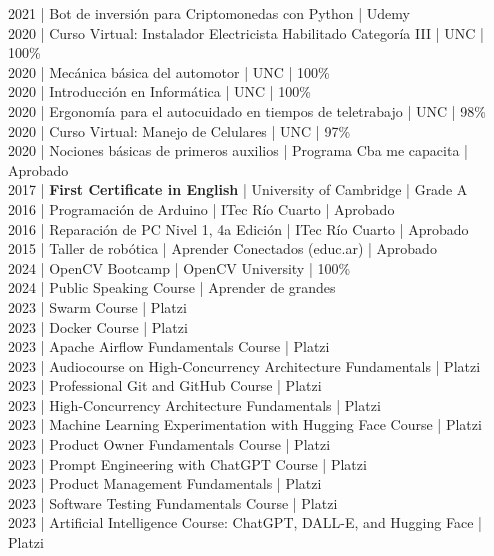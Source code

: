{2021 | Bot de inversión para Criptomonedas con Python | Udemy \\
2020 | Curso Virtual: Instalador Electricista Habilitado Categoría III | UNC | 100\% \\
2020 | Mecánica básica del automotor | UNC | 100\% \\
2020 | Introducción en Informática | UNC | 100\% \\
2020 | Ergonomía para el autocuidado en tiempos de teletrabajo | UNC | 98\% \\
2020 | Curso Virtual: Manejo de Celulares | UNC | 97\% \\
2020 | Nociones básicas de primeros auxilios | Programa Cba me capacita | Aprobado \\
2017 | \textbf{First Certificate in English} | University of Cambridge | Grade A \\
2016 | Programación de Arduino | ITec Río Cuarto | Aprobado \\
2016 | Reparación de PC Nivel 1, 4a Edición | ITec Río Cuarto | Aprobado \\
2015 | Taller de robótica | Aprender Conectados (educ.ar) | Aprobado \\
}{
2024 | OpenCV Bootcamp | OpenCV University | 100\% \\
2024 | Public Speaking Course | Aprender de grandes \\
2023 | Swarm Course | Platzi \\
2023 | Docker Course | Platzi \\
2023 | Apache Airflow Fundamentals Course | Platzi \\
2023 | Audiocourse on High-Concurrency Architecture Fundamentals | Platzi \\
2023 | Professional Git and GitHub Course | Platzi \\
2023 | High-Concurrency Architecture Fundamentals | Platzi \\
2023 | Machine Learning Experimentation with Hugging Face Course | Platzi \\
2023 | Product Owner Fundamentals Course | Platzi \\
2023 | Prompt Engineering with ChatGPT Course | Platzi \\
2023 | Product Management Fundamentals | Platzi \\
2023 | Software Testing Fundamentals Course | Platzi \\
2023 | Artificial Intelligence Course: ChatGPT, DALL-E, and Hugging Face | Platzi \\
}
